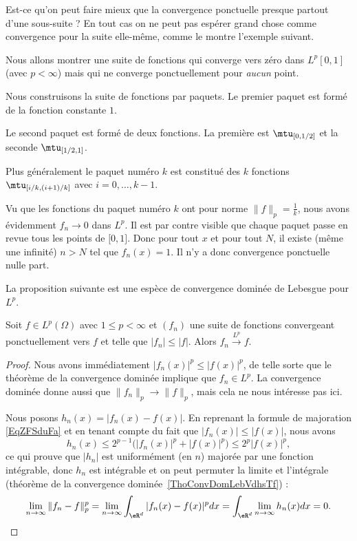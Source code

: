 Est-ce qu'on peut faire mieux que la convergence ponctuelle presque partout d'une sous-suite ? En tout cas on ne peut pas espérer grand chose comme convergence pour la suite elle-même, comme le montre l'exemple suivant.

\begin{example} \label{ExPOmxICc}
	Nous allons montrer une suite de fonctions qui converge vers zéro dans \( L^p[0,1]\) (avec \( p<\infty\)) mais qui ne converge ponctuellement pour \emph{aucun} point.

	Nous construisons la suite de fonctions par paquets. Le premier paquet est formé de la fonction constante \( 1\).

	Le second paquet est formé de deux fonctions. La première est \( \mtu_{\mathopen[0 , 1/2 \mathclose]}\) et la seconde \( \mtu_{\mathopen[ 1/2 , 1 \mathclose]}\).

	Plus généralement le paquet numéro \( k\) est constitué des \( k\) fonctions \( \mtu_{\mathopen[ i/k , (i+1)/k \mathclose]}\) avec \( i=0,\ldots, k-1\).

	Vu que les fonctions du paquet numéro \( k\) ont pour norme \( \| f \|_p=\frac{1}{ k }\), nous avons évidemment \( f_n\to 0\) dans \( L^p\). Il est par contre visible que chaque paquet passe en revue tous les points de \( \mathopen[ 0 , 1 \mathclose]\). Donc pour tout \( x\) et pour tout \( N\), il existe (même une infinité) \( n>N\) tel que \( f_n(x)=1\). Il n'y a donc convergence ponctuelle nulle part.
\end{example}

La proposition suivante est une espèce de convergence dominée de Lebesgue pour \( L^p\).
\begin{proposition} \label{PropBVHXycL}
	Soit \( f\in L^p(\Omega)\) avec \( 1\leq p<\infty\) et \( (f_n)\) une suite de fonctions convergeant ponctuellement vers \( f\) et telle que \( | f_n |\leq | f |\). Alors \( f_n\stackrel{L^p}{\longrightarrow}f\).
\end{proposition}

\begin{proof}
	Nous avons immédiatement \( | f_n(x) |^p\leq | f(x) |^p\), de telle sorte que le théorème de la convergence dominée implique que \( f_n\in L^p\). La convergence dominée donne aussi que \( \| f_n \|_p\to\| f \|_p\), mais cela ne nous intéresse pas ici.

	Nous posons \( h_n(x)= | f_n(x)-f(x) | \). En reprenant la formule de majoration \eqref{EqZFSduFa} et en tenant compte du fait que \( | f_n(x) |\leq | f(x) |\), nous avons
	\begin{equation}
		h_n(x)\leq 2^{p-1}\big( | f_n(x) |^p+| f(x) |^p \big)\leq 2^p| f(x) |^p,
	\end{equation}
	ce qui prouve que \( | h_n |\) est uniformément (en \( n\)) majorée par une fonction intégrable, donc \( h_n\) est intégrable et on peut permuter la limite et l'intégrale (théorème de la convergence dominée~\ref{ThoConvDomLebVdhsTf}) :
	\begin{equation}
		\lim_{n\to \infty} \| f_n-f \|^p_p=\lim_{n\to \infty} \int_{\eR^d}| f_n(x)-f(x) |^pdx=\int_{\eR^d}\lim_{n\to \infty} h_n(x)dx=0.
	\end{equation}
\end{proof}

